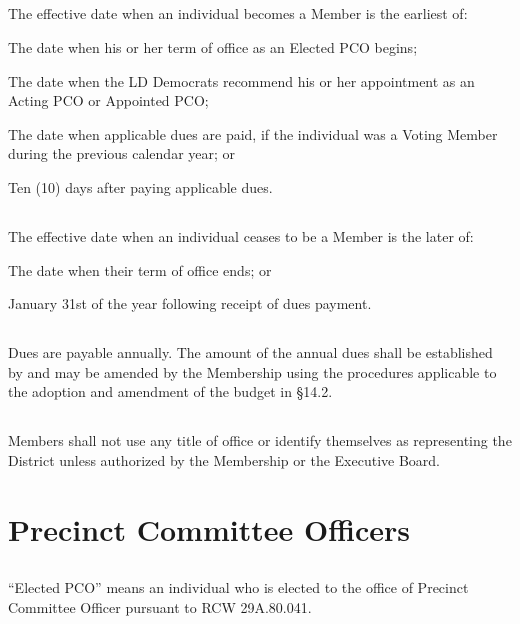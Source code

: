 \documentclass{article}
\newcommand{\fortythird}{\nth{43}}
\newcommand{\district}{\fortythird{} District}
\newcommand{\thedistrict}{the \district{}}
\begin{document}
\subsection{}
The effective date when an individual becomes a Member is the earliest of:
\begin{alphalist}
    \item The date when his or her term of office as an Elected PCO begins;
    \item The date when the \fortythird{} LD Democrats recommend his or her appointment as an Acting PCO or
Appointed PCO;
    \item The date when applicable dues are paid, if the individual was a Voting Member during the previous
calendar year; or
    \item Ten (10) days after paying applicable dues.
\end{alphalist}

\subsection{}
The effective date when an individual ceases to be a Member is the later of:
\begin{alphalist}
    \item The date when their term of office ends; or
    \item January 31st of the year following receipt of dues payment.
\end{alphalist}

\subsection{}
Dues are payable annually. The amount of the annual dues shall be established by and may be amended by the Membership using the procedures applicable to the adoption and amendment of the budget in §14.2.

\subsection{}
Members shall not use any title of office or identify themselves as representing \thedistrict{} unless authorized by the Membership or the Executive Board.

\section{Precinct Committee Officers}
\subsection{}
“Elected PCO” means an individual who is elected to the office of Precinct Committee Officer pursuant to RCW 29A.80.041.
\end{document}
